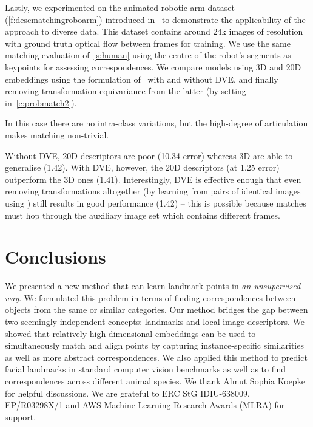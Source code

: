 \documentclass[10pt,twocolumn,letterpaper]{article}
\makeatletter
\renewcommand{\paragraph}{\@startsection{paragraph}{4}{\z@}{0.5em}{-1em}{\normalfont\normalsize\bfseries}}
\makeatother
\begin{document}
Lastly, we experimented on the animated robotic arm dataset (\cref{f:descmatchingroboarm}) introduced in~\cite{thewlis17Bunsupervised} to demonstrate the applicability of the approach to diverse data.
This dataset contains around 24k images of resolution  with ground truth optical flow between frames for training.
We use the same matching evaluation of~\cref{s:human} using the centre of the robot's segments as keypoints for assessing correspondences.
We compare models using 3D and 20D embeddings using the formulation of~\cite{thewlis17Bunsupervised} with and without DVE, and finally removing transformation equivariance from the latter (by setting  in~\cref{e:probmatch2}).

In this case there are no intra-class variations, but the high-degree of articulation makes matching non-trivial.

Without DVE, 20D descriptors are poor (10.34 error) whereas 3D are able to generalise (1.42). With DVE, however, the 20D descriptors (at 1.25 error) outperform the 3D ones (1.41).
Interestingly, DVE is effective enough that even removing transformations altogether (by learning from pairs of identical images using ) still results in good performance (1.42) -- this is possible because matches must hop through the auxiliary image set  which contains different frames.

 \section{Conclusions}\label{s:conc}

We presented a new method that can learn landmark points in \emph{an unsupervised way}.
We formulated this problem in terms of finding correspondences between objects from the same or similar categories.
Our method bridges the gap between two seemingly independent concepts: landmarks and local image descriptors.
We showed that relatively high dimensional embeddings can be used to simultaneously match and align points by capturing instance-specific similarities as well as more abstract correspondences.
We also applied this method to predict facial landmarks in standard computer vision benchmarks as well as to find  correspondences across different animal species. \paragraph{Acknowledgements.} We thank Almut Sophia Koepke for helpful discussions.  We are grateful to ERC StG IDIU-638009, EP/R03298X/1 and AWS Machine Learning Research Awards (MLRA) for support.
{\clearpage}
\end{document}
